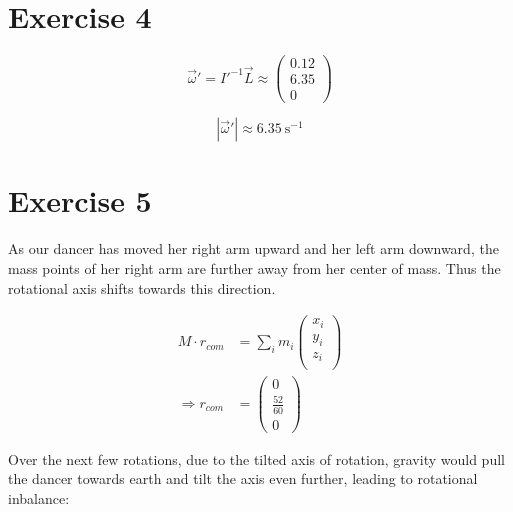 \documentclass[10pt,DIV10,a4paper]{scrartcl}
\begin{document}
\section*{Exercise 4}

$$\vec{\omega}' = I'^{-1}\vec{L} \approx \left(\begin{array}{r}
0.12\\
6.35\\
0
\end{array}\right)$$

$$|\vec{\omega}'| \approx 6.35\ \text{s}^{-1}$$

\section*{Exercise 5}

As our dancer has moved her right arm upward and her left arm downward, the mass points of her right arm are further away from her center of mass. Thus the rotational axis shifts towards this direction.

\begin{align*}
M\cdot r_{com}&=\sum_i m_i \left( \begin{array}{r}
x_i\\
y_i\\
z_i\\
\end{array} \right) \\
\Rightarrow r_{com}&=\left(\begin{array}{r}
0\\
\frac{52}{60}\\
0
\end{array} \right)
\end{align*}

Over the next few rotations, due to the tilted axis of rotation, gravity would pull the dancer towards earth and tilt the axis even further, leading to rotational inbalance:
\end{document}
